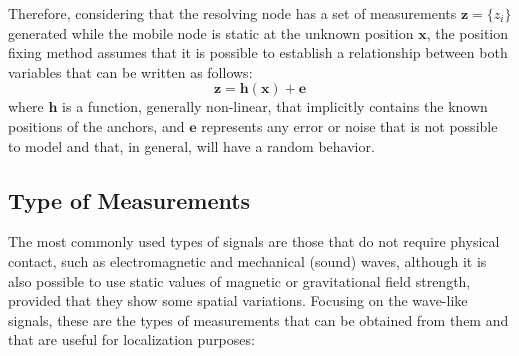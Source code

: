 Therefore, considering that the resolving node has a set of measurements $\boldsymbol{z}=\{z_i\}$ generated while the mobile node is static at the unknown position $\boldsymbol{x}$, the position fixing method assumes that it is possible to establish a relationship between both variables that can be written as follows:
\begin{equation}
\label{eqn_observation}
	\boldsymbol{z}=\boldsymbol{h}(\boldsymbol{x})+\boldsymbol{e}
\end{equation}
where $\boldsymbol{h}$ is a function, generally non-linear, that implicitly contains the known positions of the anchors, and $\boldsymbol{e}$ represents any error or noise that is not possible to model and that, in general, will have a random behavior.
\subsection{Type of Measurements}
\label{sec:2_2_1_positionFix_metric}
The most commonly used types of signals are those that do not require physical contact, such as electromagnetic and mechanical (sound) waves, although it is also possible to use static values of magnetic or gravitational field strength, provided that they show some spatial variations.
Focusing on the wave-like signals, these are the types of measurements that can be obtained from them and that are useful for localization purposes:
